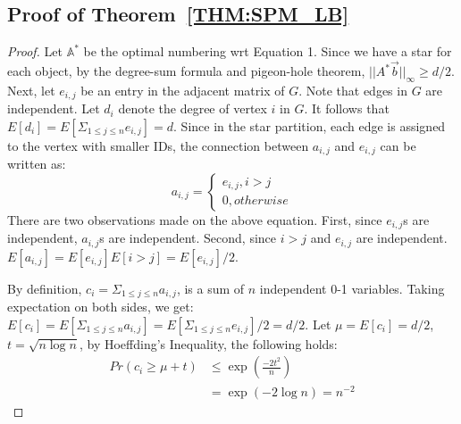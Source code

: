 \subsection{Proof of Theorem~\ref{THM:SPM_LB}}
\begin{proof}
Let $\mathbb{A}^*$ be the optimal numbering wrt Equation 1. Since we have a star
for each object, by the degree-sum formula and pigeon-hole theorem, $||A^*\vec{b}||_\infty \geq d/2$.
Next, let $e_{i,j}$ be an entry in the adjacent matrix of $G$. Note that edges in $G$ are independent. 
Let $d_i$ denote the degree of vertex $i$ in $G$. 
It follows that $E[d_i]=E[\Sigma_{1\leq j \leq n}e_{i,j}]=d$.
Since in the star partition, each edge is assigned to the vertex
with smaller IDs, the connection between $a_{i,j}$ and $e_{i,j}$ can be written as:
\begin{equation*}
a_{i,j} = \begin{cases}
			e_{i,j}, i>j \\
			0, otherwise
		  \end{cases}  
\end{equation*}
There are two observations made on the above equation. First, since $e_{i,j}$s are independent,
$a_{i,j}$s are independent. Second, since $i>j$ and $e_{i,j}$ are independent. 
$E[a_{i,j}] = E[e_{i,j}]E[i>j]= E[e_{i,j}]/2$.

By definition, $c_i = \Sigma_{1\leq j \leq n} a_{i,j}$, 
is a sum of $n$ independent 0-1 variables. Taking expectation on both sides, 
we get: $E[c_i] = E[\Sigma_{1\leq j \leq n} a_{i,j}]=E[\Sigma_{1\leq j \leq n} e_{i,j}]/2 = d/2$. Let $\mu =E[c_i] = d/2$, 
$t = \sqrt{n\log n}$, by Hoeffding's Inequality, the following holds:
\begin{equation*}
\begin{split}
	Pr(c_i \geq \mu + t) 
						&\leq \exp(\frac{-2t^2}{n}) \\
						&= \exp(-2\log n) = n^{-2}
\end{split}
\end{equation*}


\end{proof}
